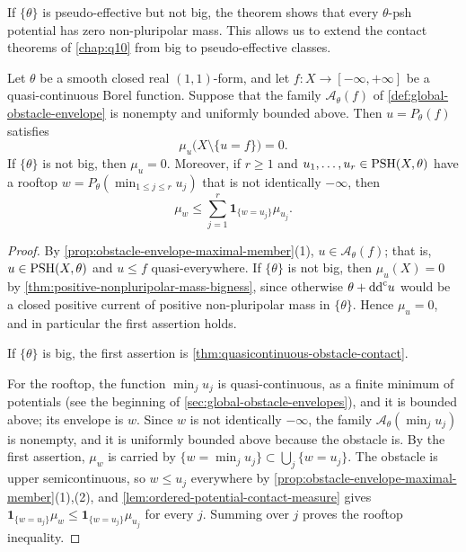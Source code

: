 
If $\{\theta\}$ is pseudo-effective but not big, the theorem shows that every $\theta$-psh potential has zero non-pluripolar mass. This allows us to extend the contact theorems of \cref{chap:q10} from big to pseudo-effective classes.

\begin{corollary}\label{cor:pseudoeffective-obstacle-contact}
Let $\theta$ be a smooth closed real $(1,1)$-form, and let $f\colon X\to[-\infty,+\infty]$ be a quasi-continuous Borel function. Suppose that the family $\mathcal A_\theta(f)$ of \cref{def:global-obstacle-envelope} is nonempty and uniformly bounded above. Then $u=P_\theta(f)$ satisfies
\[
 \mu_u\bigl(X\setminus\{u=f\}\bigr)=0.
\]
If $\{\theta\}$ is not big, then $\mu_u=0$. Moreover, if $r\geq1$ and $u_1,\ldots,u_r\in\mathrm{PSH}(X,\theta)$ have a rooftop $w=P_\theta(\min_{1\leq j\leq r}u_j)$ that is not identically $-\infty$, then
\[
 \mu_w\leq\sum_{j=1}^r\mathbf1_{\{w=u_j\}}\mu_{u_j}.
\]
\end{corollary}
\begin{proof}
By \cref{prop:obstacle-envelope-maximal-member}(1), $u\in\mathcal A_\theta(f)$; that is, $u\in\mathrm{PSH}(X,\theta)$ and $u\leq f$ quasi-everywhere. If $\{\theta\}$ is not big, then $\mu_u(X)=0$ by \cref{thm:positive-nonpluripolar-mass-bigness}, since otherwise $\theta+\mathrm{dd}^{\mathrm{c}} u$ would be a closed positive current of positive non-pluripolar mass in $\{\theta\}$. Hence $\mu_u=0$, and in particular the first assertion holds.

If $\{\theta\}$ is big, the first assertion is \cref{thm:quasicontinuous-obstacle-contact}.

For the rooftop, the function $\min_ju_j$ is quasi-continuous, as a finite minimum of potentials (see the beginning of \cref{sec:global-obstacle-envelopes}), and it is bounded above; its envelope is $w$. Since $w$ is not identically $-\infty$, the family $\mathcal A_\theta(\min_ju_j)$ is nonempty, and it is uniformly bounded above because the obstacle is. By the first assertion, $\mu_w$ is carried by $\{w=\min_ju_j\}\subset\bigcup_j\{w=u_j\}$. The obstacle is upper semicontinuous, so $w\leq u_j$ everywhere by \cref{prop:obstacle-envelope-maximal-member}(1),(2), and \cref{lem:ordered-potential-contact-measure} gives $\mathbf1_{\{w=u_j\}}\mu_w\leq\mathbf1_{\{w=u_j\}}\mu_{u_j}$ for every $j$. Summing over $j$ proves the rooftop inequality.
\end{proof}


